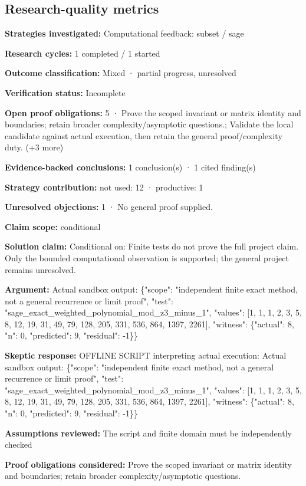 \documentclass[11pt]{article}
\begin{document}
\subsection{Research-quality metrics}
\textbf{Strategies investigated:} Computational feedback: subset / sage\par
\textbf{Research cycles:} 1 completed / 1 started\par
\textbf{Outcome classification:} Mixed · partial progress, unresolved\par
\textbf{Verification status:} Incomplete\par
\textbf{Open proof obligations:} 5 · Prove the scoped invariant or matrix identity and boundaries; retain broader complexity/asymptotic questions.; Validate the local candidate against actual execution, then retain the general proof/complexity duty. (+3 more)\par
\textbf{Evidence-backed conclusions:} 1 conclusion(s) · 1 cited finding(s)\par
\textbf{Strategy contribution:} not used: 12 · productive: 1\par
\textbf{Unresolved objections:} 1 · No general proof supplied.\par
\textbf{Claim scope:} conditional\par
\textbf{Solution claim:} Conditional on: Finite tests do not prove the full project claim. Only the bounded computational observation is supported; the general project remains unresolved.\par
\textbf{Argument:} Actual sandbox output: \{"scope": "independent finite exact method, not a general recurrence or limit proof", "test": "sage\_exact\_weighted\_polynomial\_mod\_z3\_minus\_1", "values": [1, 1, 1, 2, 3, 5, 8, 12, 19, 31, 49, 79, 128, 205, 331, 536, 864, 1397, 2261], "witness": \{"actual": 8, "n": 0, "predicted": 9, "residual": -1\}\}\par
\textbf{Skeptic response:} OFFLINE SCRIPT interpreting actual execution: Actual sandbox output: \{"scope": "independent finite exact method, not a general recurrence or limit proof", "test": "sage\_exact\_weighted\_polynomial\_mod\_z3\_minus\_1", "values": [1, 1, 1, 2, 3, 5, 8, 12, 19, 31, 49, 79, 128, 205, 331, 536, 864, 1397, 2261], "witness": \{"actual": 8, "n": 0, "predicted": 9, "residual": -1\}\}\par
\textbf{Assumptions reviewed:} The script and finite domain must be independently checked\par
\textbf{Proof obligations considered:} Prove the scoped invariant or matrix identity and boundaries; retain broader complexity/asymptotic questions.\par
\end{document}
